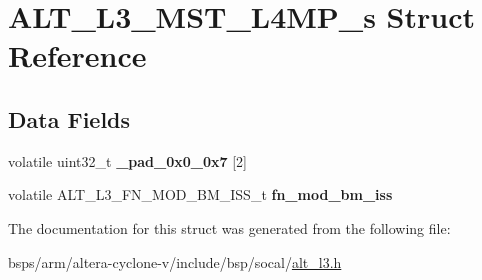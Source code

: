 \hypertarget{structALT__L3__MST__L4MP__s}{}\section{A\+L\+T\+\_\+\+L3\+\_\+\+M\+S\+T\+\_\+\+L4\+M\+P\+\_\+s Struct Reference}
\label{structALT__L3__MST__L4MP__s}
\subsection*{Data Fields}
\begin{DoxyCompactItemize}
\item 
\mbox{\label{structALT__L3__MST__L4MP__s_a0818171e157852497349aff58c791772}} 
volatile uint32\+\_\+t {\bfseries \+\_\+pad\+\_\+0x0\+\_\+0x7} \mbox{[}2\mbox{]}
\item 
\mbox{\label{structALT__L3__MST__L4MP__s_a474fcbd99cf74162a7e87002dd48b4e8}} 
volatile A\+L\+T\+\_\+\+L3\+\_\+\+F\+N\+\_\+\+M\+O\+D\+\_\+\+B\+M\+\_\+\+I\+S\+S\+\_\+t {\bfseries fn\+\_\+mod\+\_\+bm\+\_\+iss}
\end{DoxyCompactItemize}


The documentation for this struct was generated from the following file\+:\begin{DoxyCompactItemize}
\item 
bsps/arm/altera-\/cyclone-\/v/include/bsp/socal/\mbox{\hyperlink{alt__l3_8h}{alt\+\_\+l3.\+h}}\end{DoxyCompactItemize}
